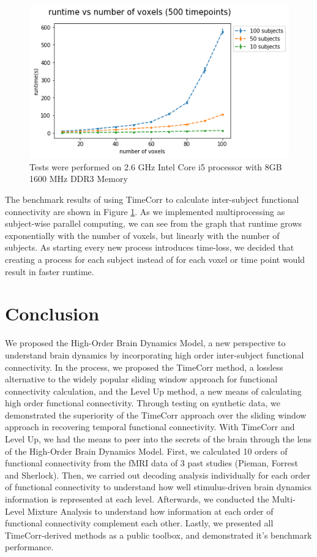 \documentclass[11pt]{article}
\begin{document}
\begin{figure}[!htb]
\centering
\includegraphics[width=1\textwidth]{../figures/Benchmark/500timepoints.png}
Tests were performed on 2.6 GHz Intel Core i5 processor with 8GB 1600 MHz DDR3 Memory
\label{fig:benchmark}
\end{figure}

The benchmark results of using TimeCorr to calculate inter-subject functional connectivity are shown in Figure \ref{fig:benchmark}. As we implemented multiprocessing as subject-wise parallel computing, we can see from the graph that runtime grows exponentially with the number of voxels, but linearly with the number of subjects. As starting every new process introduces time-loss, we decided that creating a process for each subject instead of for each voxel or time point would result in faster runtime.

\section{Conclusion}
We proposed the High-Order Brain Dynamics Model, a new perspective to understand brain dynamics by incorporating high order inter-subject functional connectivity. In the process, we proposed the TimeCorr method, a lossless alternative to the widely popular sliding window approach for functional connectivity calculation, and the Level Up method, a new means of calculating high order functional connectivity. Through testing on synthetic data, we demonstrated the superiority of the TimeCorr approach over the sliding window approach in recovering temporal functional connectivity. With TimeCorr and Level Up, we had the means to peer into the secrets of the brain through the lens of the High-Order Brain Dynamics Model. First, we calculated 10 orders of functional connectivity from the fMRI data of 3 past studies (Pieman, Forrest and Sherlock). Then, we carried out decoding analysis individually for each order of functional connectivity to understand how well stimulus-driven brain dynamics information is represented at each level. Afterwards, we conducted the Multi-Level Mixture Analysis to understand how information at each order of functional connectivity complement each other. Lastly, we presented all TimeCorr-derived methods as a public toolbox, and demonstrated it's benchmark performance.
\end{document}

